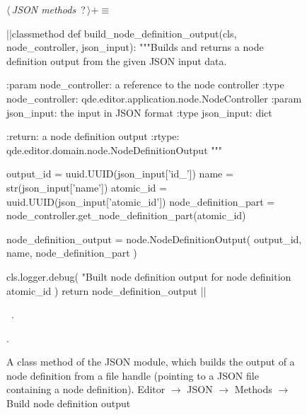\documentclass[%
    a4paper,    %
    justified,  %
    nobib,      %
    openany     %
]{tufte-book}
\makeatletter
\renewcommand{\label}[1]{\@tufte@label{##1}}%
\makeatother
\begin{document}
\begin{figure}
\begin{flushleft} \small
\begin{minipage}{\linewidth}\label{scrap137}\raggedright\small
{} $\langle\,${\itshape JSON methods}\nobreak\ {\footnotesize {?}}$\,\rangle+\equiv$
\vspace{-1ex}
\begin{pythoncode}
|\normalfont{}\fontfamily{}|classmethod
def build_node_definition_output(cls, node_controller, json_input):
    """Builds and returns a node definition output from the given JSON input
    data.

    :param node_controller: a reference to the node controller
    :type  node_controller: qde.editor.application.node.NodeController
    :param json_input: the input in JSON format
    :type  json_input: dict

    :return: a node definition output
    :rtype:  qde.editor.domain.node.NodeDefinitionOutput
    """

    output_id             = uuid.UUID(json_input['id_'])
    name                 = str(json_input['name'])
    atomic_id            = uuid.UUID(json_input['atomic_id'])
    node_definition_part = node_controller.get_node_definition_part(atomic_id)

    node_definition_output = node.NodeDefinitionOutput(
        output_id,
        name,
        node_definition_part
    )

    cls.logger.debug(
        "Built node definition output for node definition %
        atomic_id
    )
    return node_definition_output
|\NWsep|
\end{pythoncode}
\vspace{1.5ex}
\footnotesize
\begin{list}{}{\setlength{\itemsep}{-\parsep}\setlength{\itemindent}{-\leftmargin}}
\item \NWtxtMacroDefBy\ .
\item {\NWtxtMacroNoRef}.

\item{}
\end{list}
\end{minipage}\vspace{4ex}
\end{flushleft}
\caption{A class method of the JSON module, which builds the output of a node
  definition from a file handle (pointing to a JSON file containing a node
  definition).
  \newline{}\newline{}Editor $\rightarrow$ JSON $\rightarrow$
  Methods $\rightarrow$ Build node definition output}
\label{editor:lst:json:methods:build-node-definition-output}
\end{figure}
\end{document}
